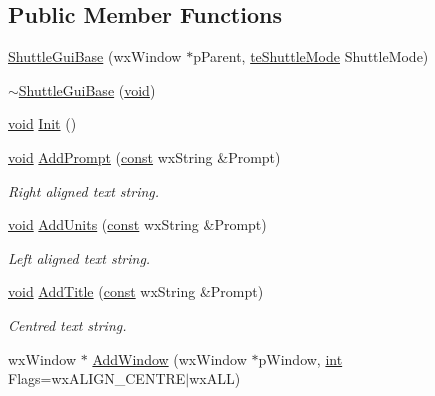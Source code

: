 \subsection*{Public Member Functions}
\begin{DoxyCompactItemize}
\item 
\hyperlink{class_shuttle_gui_base_ab340c83518ac1abc8d97303099de4275}{Shuttle\+Gui\+Base} (wx\+Window $\ast$p\+Parent, \hyperlink{_shuttle_gui_8h_a0c8bf96cca5e5b020b22818e8490b964}{te\+Shuttle\+Mode} Shuttle\+Mode)
\item 
\hyperlink{class_shuttle_gui_base_adfd72e1e1c057887d23ab089073be2fb}{$\sim$\+Shuttle\+Gui\+Base} (\hyperlink{sound_8c_ae35f5844602719cf66324f4de2a658b3}{void})
\item 
\hyperlink{sound_8c_ae35f5844602719cf66324f4de2a658b3}{void} \hyperlink{class_shuttle_gui_base_a5d85e62d9eba650262c5bd241054e4ec}{Init} ()
\item 
\hyperlink{sound_8c_ae35f5844602719cf66324f4de2a658b3}{void} \hyperlink{class_shuttle_gui_base_aa64878f881c9394090275f01296888c6}{Add\+Prompt} (\hyperlink{getopt1_8c_a2c212835823e3c54a8ab6d95c652660e}{const} wx\+String \&Prompt)
\begin{DoxyCompactList}\small\item\em Right aligned text string. \end{DoxyCompactList}\item 
\hyperlink{sound_8c_ae35f5844602719cf66324f4de2a658b3}{void} \hyperlink{class_shuttle_gui_base_a54816a02cbcc4d09b3d40c2b731ba9e5}{Add\+Units} (\hyperlink{getopt1_8c_a2c212835823e3c54a8ab6d95c652660e}{const} wx\+String \&Prompt)
\begin{DoxyCompactList}\small\item\em Left aligned text string. \end{DoxyCompactList}\item 
\hyperlink{sound_8c_ae35f5844602719cf66324f4de2a658b3}{void} \hyperlink{class_shuttle_gui_base_aee0fd3f1d39ff229d17301f10ca5b837}{Add\+Title} (\hyperlink{getopt1_8c_a2c212835823e3c54a8ab6d95c652660e}{const} wx\+String \&Prompt)
\begin{DoxyCompactList}\small\item\em Centred text string. \end{DoxyCompactList}\item 
wx\+Window $\ast$ \hyperlink{class_shuttle_gui_base_ab9c4e1935a85180c4aff8b056b29c418}{Add\+Window} (wx\+Window $\ast$p\+Window, \hyperlink{xmltok_8h_a5a0d4a5641ce434f1d23533f2b2e6653}{int} Flags=wx\+A\+L\+I\+G\+N\+\_\+\+C\+E\+N\+T\+RE$\vert$wx\+A\+LL)

\end{DoxyCompactItemize}
